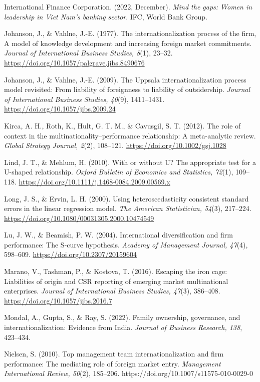 \documentclass[
  12pt]{article}
\begin{document}
International Finance Corporation. (2022, December). \emph{Mind the
gaps: Women in leadership in Viet Nam's banking sector}. IFC, World Bank
Group.

Johanson, J., \& Vahlne, J.-E. (1977). The internationalization process
of the firm, A model of knowledge development and increasing foreign
market commitments. \emph{Journal of International Business Studies,
8}(1), 23--32. \url{https://doi.org/10.1057/palgrave.jibs.8490676}

Johanson, J., \& Vahlne, J.-E. (2009). The Uppsala internationalization
process model revisited: From liability of foreignness to liability of
outsidership. \emph{Journal of International Business Studies, 40}(9),
1411--1431. \url{https://doi.org/10.1057/jibs.2009.24}

Kirca, A. H., Roth, K., Hult, G. T. M., \& Cavusgil, S. T. (2012). The
role of context in the multinationality--performance relationship: A
meta-analytic review. \emph{Global Strategy Journal, 2}(2), 108--121.
\url{https://doi.org/10.1002/gsj.1028}

Lind, J. T., \& Mehlum, H. (2010). With or without U? The appropriate
test for a U-shaped relationship. \emph{Oxford Bulletin of Economics and
Statistics, 72}(1), 109--118.
\url{https://doi.org/10.1111/j.1468-0084.2009.00569.x}

Long, J. S., \& Ervin, L. H. (2000). Using heteroscedasticity consistent
standard errors in the linear regression model. \emph{The American
Statistician, 54}(3), 217--224.
\url{https://doi.org/10.1080/00031305.2000.10474549}

Lu, J. W., \& Beamish, P. W. (2004). International diversification and
firm performance: The S-curve hypothesis. \emph{Academy of Management
Journal, 47}(4), 598--609. \url{https://doi.org/10.2307/20159604}

Marano, V., Tashman, P., \& Kostova, T. (2016). Escaping the iron cage:
Liabilities of origin and CSR reporting of emerging market multinational
enterprises. \emph{Journal of International Business Studies, 47}(3),
386--408. \url{https://doi.org/10.1057/jibs.2016.7}

Mondal, A., Gupta, S., \& Ray, S. (2022). Family ownership, governance,
and internationalization: Evidence from India. \emph{Journal of Business
Research, 138}, 423--434.

Nielsen, S. (2010). Top management team internationalization and firm
performance: The mediating role of foreign market entry.
\emph{Management International Review, 50}(2), 185--206.
https://doi.org/10.1007/s11575-010-0029-0
\end{document}
